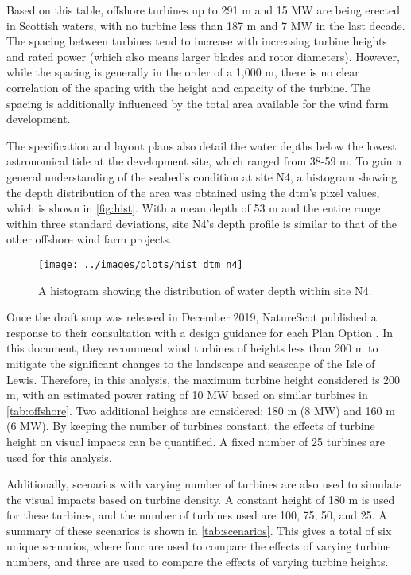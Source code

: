 Based on this table, offshore turbines up to 291 m and 15 MW are being erected in Scottish waters, with no turbine less than 187 m and 7 MW in the last decade. The spacing between turbines tend to increase with increasing turbine heights and rated power (which also means larger blades and rotor diameters). However, while the spacing is generally in the order of a 1,000 m, there is no clear correlation of the spacing with the height and capacity of the turbine. The spacing is additionally influenced by the total area available for the wind farm development.

The specification and layout plans also detail the water depths below the lowest astronomical tide at the development site, which ranged from 38-59 m. To gain a general understanding of the seabed's condition at site N4, a histogram showing the depth distribution of the area was obtained using the \gls{dtm}'s pixel values, which is shown in \autoref{fig:hist}. With a mean depth of 53 m and the entire range within three standard deviations, site N4's depth profile is similar to that of the other offshore wind farm projects.

\begin{figure}
  \centering
  \texttt{[image: ../images/plots/hist\_dtm\_n4]}
  \caption{A histogram showing the distribution of water depth within site N4. \label{fig:hist}}
\end{figure}

Once the draft \gls{smp} was released in December 2019, NatureScot published a response to their consultation with a design guidance for each Plan Option \autocite{naturescot-smp}. In this document, they recommend wind turbines of heights less than 200 m to mitigate the significant changes to the landscape and seascape of the Isle of Lewis. Therefore, in this analysis, the maximum turbine height considered is 200 m, with an estimated power rating of 10 MW based on similar turbines in \autoref{tab:offshore}. Two additional heights are considered: 180 m (8 MW) and 160 m (6 MW). By keeping the number of turbines constant, the effects of turbine height on visual impacts can be quantified. A fixed number of 25 turbines are used for this analysis.

Additionally, scenarios with varying number of turbines are also used to simulate the visual impacts based on turbine density. A constant height of 180 m is used for these turbines, and the number of turbines used are 100, 75, 50, and 25. A summary of these scenarios is shown in \autoref{tab:scenarios}. This gives a total of six unique scenarios, where four are used to compare the effects of varying turbine numbers, and three are used to compare the effects of varying turbine heights.

